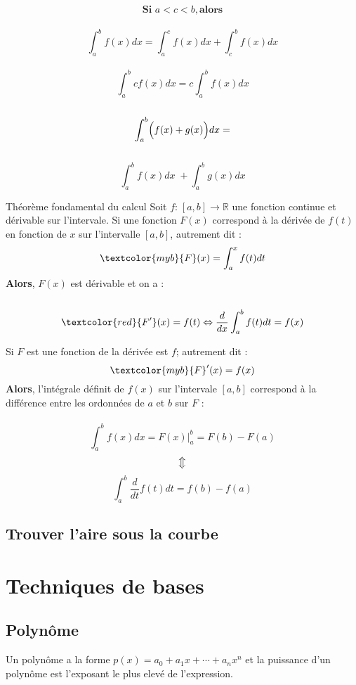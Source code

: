 \documentclass{report}
\begin{document}
\begin{multicols*}{3}
\begin{Concept}{}{}
\vspace{2em}
$$\textbf{Si } a < c < b,  \textbf{alors}$$ 
\\ 
$$\int_{a}^{b}f(x)dx = \int_{a}^{c}f(x)dx + \int_{c}^{b}f(x)dx $$ 
\\
$$\int_{a}^{b}cf(x)dx = c\int_{a}^{b}f(x)dx$$ 
\\

$$\int_{a}^{b}\Bigl(f(x) + g(x)\Bigr)dx =$$ \\ 
$$\int_{a}^{b}f(x)dx \; +  \int_{a}^{b}g(x)dx$$
\end{Concept}

\begin{Definitionx*}{Théorème fondamental du calcul}{}
    Soit $f\text{:} \; [a,b] \rightarrow \mathbb{R}$ une fonction continue
    et dérivable sur l'intervale. 
    Si une fonction  $F(x)$ correspond à la dérivée de  $f(t)$ en fonction de $x$ 
    sur l'intervalle  $[a, b]$, autrement dit : 
    $$\textcolor{myb}{F}(x) = \int_{a}^{x}f(t)dt$$ 
    \textbf{Alors}, $F(x)$ est dérivable et on a :\\\\ 
    $$\textcolor{red}{F^{\prime}}(x) = f(t) \Leftrightarrow \dfrac{d}{dx}\int_{a}^{b}f(t)dt = f(x)$$

  \vspace{2em}
  Si $F$ est une fonction de la dérivée est $f$; autrement dit : 
  $$\textcolor{myb}{F}^{\prime}(x) = f(x)$$            
  \textbf{Alors}, l'intégrale définit de $f(x)$ sur l'intervale $[a, b]$ correspond à
  la différence entre les ordonnées de $a$ et $b$ sur $F$ :
  \\\\
  
  $$\int_{a}^{b}f(x)dx = F(x)  \bigg|_{a}^{b} = F(b) - F(a) $$
  $$\big\Updownarrow$$
  $$\int_{a}^{b}\dfrac{d}{dt}f(t)dt =  f(b) - f(a)$$ 
\end{Definitionx*}


\section{Trouver l'aire sous la courbe}


\chapter{Techniques de bases}
\section{Polynôme}
\begin{Definitionx*}{}{}
  Un polynôme a la forme $p(x) = a_0 + a_1x + \cdots + a_nx^n$ et la \textcolor{myb}{puissance} d'un polynôme 
  est l'exposant le plus elevé de l'expression.    
\end{Definitionx*}


\end{multicols*}
\end{document}

